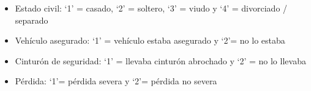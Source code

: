 \documentclass[]{book}
\newenvironment{Shaded}{\begin{snugshade}}{\end{snugshade}}
\newcommand{\DataTypeTok}[1]{\textcolor[rgb]{0.13,0.29,0.53}{#1}}
\newcommand{\DecValTok}[1]{\textcolor[rgb]{0.00,0.00,0.81}{#1}}
\newcommand{\KeywordTok}[1]{\textcolor[rgb]{0.13,0.29,0.53}{\textbf{#1}}}
\newcommand{\NormalTok}[1]{#1}
\newcommand{\OperatorTok}[1]{\textcolor[rgb]{0.81,0.36,0.00}{\textbf{#1}}}
\newcommand{\StringTok}[1]{\textcolor[rgb]{0.31,0.60,0.02}{#1}}
\providecommand{\tightlist}{%
  \setlength{\itemsep}{0pt}\setlength{\parskip}{0pt}}
\begin{document}
\begin{itemize}
\tightlist
\item
  Estado civil: `1' = casado, `2' = soltero, `3' = viudo y `4' = divorciado / separado
\end{itemize}

\begin{Shaded}
\end{Shaded}

\begin{itemize}
\tightlist
\item
  Vehículo asegurado: `1' = vehículo estaba asegurado y `2'= no lo estaba
\end{itemize}

\begin{Shaded}
\end{Shaded}

\begin{itemize}
\tightlist
\item
  Cinturón de seguridad: `1' = llevaba cinturón abrochado y `2' = no lo llevaba
\end{itemize}

\begin{Shaded}
\end{Shaded}

\begin{itemize}
\tightlist
\item
  Pérdida: `1'= pérdida severa y `2'= pérdida no severa
\end{itemize}
\end{document}

